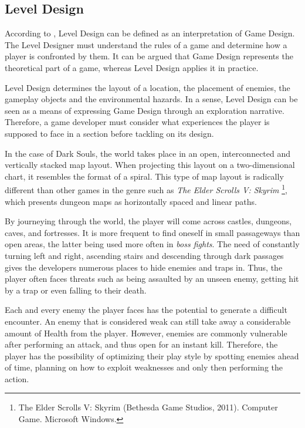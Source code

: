 \subsection{Level Design}

According to \cite{BOOK_LevelDesignConcept}, Level Design can be defined as an interpretation of Game Design. The Level Designer must understand the rules of a game and determine how a player is confronted by them. It can be argued that Game Design represents the theoretical part of a game, whereas Level Design applies it in practice.

Level Design determines the layout of a location, the placement of enemies, the gameplay objects and the environmental hazards. In a sense, Level Design can be seen as a means of expressing Game Design through an exploration narrative. Therefore, a game developer must consider what experiences the player is supposed to face in a section before tackling on its design.

In the case of Dark Souls, the world takes place in an open, interconnected and vertically stacked map layout. When projecting this layout on a two-dimensional chart, it resembles the format of a spiral. This type of map layout is radically different than other games in the genre such as \emph{The Elder Scrolls V: Skyrim} \footnote{The Elder Scrolls V: Skyrim (Bethesda Game Studios, 2011). Computer Game. Microsoft Windows.}, which presents  dungeon maps as horizontally spaced and linear paths.

By journeying through the world, the player will come across castles, dungeons, caves, and fortresses. It is more frequent to find oneself in small passageways than open areas, the latter being used more often in \emph{boss fights}. The need of constantly turning left and right, ascending stairs and descending through dark passages gives the developers numerous places to hide enemies and traps in. Thus, the player often faces threats such as being assaulted by an unseen enemy, getting hit by a trap or even falling to their death.

Each and every enemy the player faces has the potential to generate a difficult encounter. An enemy that is considered weak can still take away a considerable amount of Health from the player. However, enemies are commonly vulnerable after performing an attack, and thus open for an instant kill. Therefore, the player has the possibility of optimizing their play style by spotting enemies ahead of time, planning on how to exploit weaknesses and only then performing the action.

